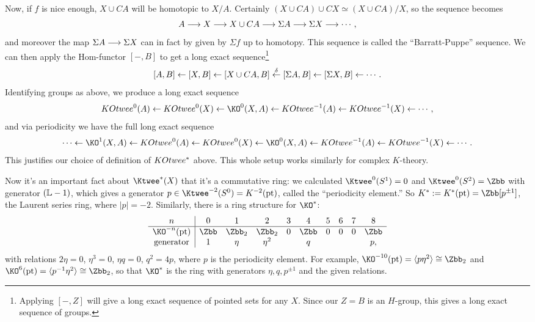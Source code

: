 Now, if $f$ is nice enough, $X \cup CA$ will be homotopic to $X / A$.  Certainly $(X \cup CA) \cup CX \simeq (X \cup CA)/X$, so the sequence becomes
\[
A \longrightarrow X \longrightarrow X \cup CA \longrightarrow \Sigma A \longrightarrow \Sigma X \longrightarrow \cdots
,\]
and moreover the map $\Sigma A \longrightarrow \Sigma X$ can in fact by given by $\Sigma f$ up to homotopy.  This sequence is called the ``Barratt-Puppe'' sequence.  We can then apply the Hom-functor $[-, B]$ to get a long exact sequence\footnote{Applying $[-, Z]$ will give a long exact sequence of pointed sets for any $X$.  Since our $Z = B$ is an $H$-group, this gives a long exact sequence of groups.}
\[
[A, B] \leftarrow [X, B] \leftarrow [X \cup CA, B] \stackrel{\delta}{\leftarrow} [\Sigma A, B] \leftarrow [\Sigma X, B] \leftarrow \cdots
.\]
Identifying groups as above, we produce a long exact sequence
\[
\\KOtwee^0 (A) \from \\KOtwee^0(X) \from \KO^0(X, A) \from \\KOtwee^{-1}(A) \from \\KOtwee^{-1}(X) \from \cdots
,\]
and via periodicity we have the full long exact sequence
\[
\cdots \from \KO^1(X, A) \from \\KOtwee^0 (A) \from \\KOtwee^0(X) \from \KO^0(X, A) \from \\KOtwee^{-1}(A) \from \\KOtwee^{-1}(X) \from \cdots
.\]
This justifies our choice of definition of $\\KOtwee^*$ above.  This whole setup works similarly for complex $K$-theory.

Now it's an important fact about $\Ktwee^* (X)$ that it's a commutative ring: we calculated $\Ktwee^0 (S^1) = 0$ and $\Ktwee^0 (S^2) = \Zbb$ with generator $(\mathbb{L} - 1)$, which gives a generator $p \in \Ktwee^{-2} (S^0) = K^{-2} (\ptspace)$, called the ``periodicity element.''  So $K^* \eqdef K^* (\ptspace) = \Zbb[p^{\pm 1}]$, the Laurent series ring, where $|p| = -2$.  Similarly, there is a ring structure for $\KO^*$:
\[
\begin{array}{c|ccccccccc}
n & 0 & 1 & 2 & 3 & 4 & 5 & 6 & 7 & 8 \\
\hline
\KO^{-n} (\ptspace) & \Zbb & \Zbb_2 & \Zbb_2 & 0 & \Zbb & 0 & 0 & 0 & \Zbb \\
\mathrm{generator} & 1 & \eta & \eta^2 & & q & & & & p,
\end{array}
\]
with relations $2\eta = 0$, $\eta^3 = 0$, $\eta q = 0$, $q^2 = 4p$, where $p$ is the periodicity element. For example, $\KO^{-10}(\ptspace) = \langle p\eta^2 \rangle \cong \Zbb_2$ and $\KO^{6}(\ptspace) = \langle p^{-1}\eta^2 \rangle \cong \Zbb_2$, so that $\KO^*$ is the ring with generators $\eta,q,p^{\pm1}$ and the given relations.

